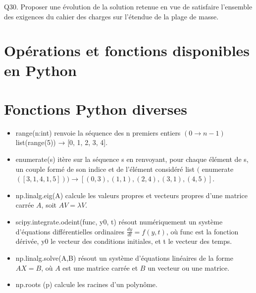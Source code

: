 \documentclass[10pt]{article}
\begin{document}
Q30. Proposer une évolution de la solution retenue en vue de satisfaire l'ensemble des exigences du cahier des charges sur l'étendue de la plage de masse.

\section{Opérations et fonctions disponibles en Python}
\section{Fonctions Python diverses}
\begin{itemize}
  \item[-] range(n:int) renvoie la séquence des n premiers entiers $(0 \rightarrow n-1)$ list(range(5)) → [0, 1, 2, 3, 4].
  \item[-] enumerate(s) itère sur la séquence s en renvoyant, pour chaque élément de s, un couple formé de son indice et de l'élément considéré list $($ enumerate $([3,1,4,1,5])) \rightarrow[(0,3),(1,1),(2,4),(3,1),(4,5)]$.
  \item[-] np.linalg.eig(A) calcule les valeurs propres et vecteurs propres d'une matrice carrée $A$, soit $A V=\lambda V$.
  \item[-] scipy.integrate.odeint(func, y0, t) résout numériquement un système d'équations différentielles ordinaires $\frac{d y}{d t}=f(y, t)$, où func est la fonction dérivée, y0 le vecteur des conditions initiales, et t le vecteur des temps.
  \item[-] np.linalg.solve(A,B) résout un système d'équations linéaires de la forme $A X=B$, où $A$ est une matrice carrée et $B$ un vecteur ou une matrice.
  \item[-] np.roots (p) calcule les racines d'un polynôme.
\end{itemize}
\end{document}

